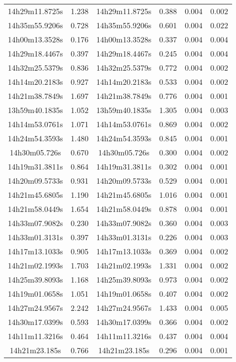 \begin{table}
\begin{tabular}{cccccc}
14h29m11.8725s & 1.238 & 14h29m11.8725s & 0.388 & 0.004 & 0.002 \\
14h35m55.9206s & 0.728 & 14h35m55.9206s & 0.601 & 0.004 & 0.022 \\
14h00m13.3528s & 0.176 & 14h00m13.3528s & 0.337 & 0.004 & 0.004 \\
14h29m18.4467s & 0.397 & 14h29m18.4467s & 0.245 & 0.004 & 0.004 \\
14h32m25.5379s & 0.836 & 14h32m25.5379s & 0.772 & 0.004 & 0.002 \\
14h14m20.2183s & 0.927 & 14h14m20.2183s & 0.533 & 0.004 & 0.002 \\
14h21m38.7849s & 1.697 & 14h21m38.7849s & 0.776 & 0.004 & 0.001 \\
13h59m40.1835s & 1.052 & 13h59m40.1835s & 1.305 & 0.004 & 0.003 \\
14h14m53.0761s & 1.071 & 14h14m53.0761s & 0.869 & 0.004 & 0.002 \\
14h24m54.3593s & 1.480 & 14h24m54.3593s & 0.845 & 0.004 & 0.001 \\
14h30m05.726s & 0.670 & 14h30m05.726s & 0.300 & 0.004 & 0.002 \\
14h19m31.3811s & 0.864 & 14h19m31.3811s & 0.302 & 0.004 & 0.001 \\
14h20m09.5733s & 0.931 & 14h20m09.5733s & 0.529 & 0.004 & 0.001 \\
14h21m45.6805s & 1.190 & 14h21m45.6805s & 1.016 & 0.004 & 0.001 \\
14h21m58.0449s & 1.654 & 14h21m58.0449s & 0.878 & 0.004 & 0.001 \\
14h33m07.9082s & 0.230 & 14h33m07.9082s & 0.360 & 0.004 & 0.003 \\
14h33m01.3131s & 0.397 & 14h33m01.3131s & 0.226 & 0.004 & 0.003 \\
14h17m13.1033s & 0.905 & 14h17m13.1033s & 0.369 & 0.004 & 0.002 \\
14h21m02.1993s & 1.703 & 14h21m02.1993s & 1.331 & 0.004 & 0.002 \\
14h25m39.8093s & 1.168 & 14h25m39.8093s & 0.973 & 0.004 & 0.002 \\
14h19m01.0658s & 1.051 & 14h19m01.0658s & 0.407 & 0.004 & 0.002 \\
14h27m24.9567s & 2.242 & 14h27m24.9567s & 1.433 & 0.004 & 0.005 \\
14h30m17.0399s & 0.593 & 14h30m17.0399s & 0.366 & 0.004 & 0.002 \\
14h11m11.3216s & 0.464 & 14h11m11.3216s & 0.437 & 0.004 & 0.004 \\
14h21m23.185s & 0.766 & 14h21m23.185s & 0.296 & 0.004 & 0.001 \\

\end{tabular}
\end{table}
